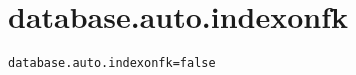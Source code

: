 \section{database.auto.indexonfk}
\label{configuration:DatabaseAutoIndexonfk}
\AvailableInJavaOnly{\TODO}
\begin{lstlisting}[style=Props,caption={Usage example for \textit{database.auto.indexonfk}}]
database.auto.indexonfk=false
\end{lstlisting}